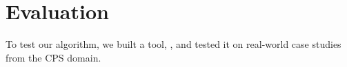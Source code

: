 \section{Evaluation}

To test our algorithm, we built a tool, \ourTool, and tested it on real-world case studies from the CPS domain.
